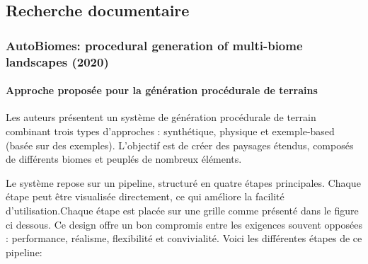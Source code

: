 
\subsection{Recherche documentaire}
\subsubsection{AutoBiomes: procedural generation of multi-biome landscapes (2020)}

    
    \paragraph{Approche proposée pour la génération procédurale de terrains}
    Les auteurs présentent un système de génération procédurale de terrain combinant trois types d’approches : synthétique, physique et exemple-based (basée sur des exemples). L’objectif est de créer des paysages étendus, composés de différents biomes et peuplés de nombreux éléments.
    
    Le système repose sur un pipeline, structuré en quatre étapes principales. Chaque étape peut être visualisée directement, ce qui améliore la facilité d’utilisation.Chaque étape est placée sur une grille comme présenté dans le figure ci dessous. Ce design offre un bon compromis entre les exigences souvent opposées : performance, réalisme, flexibilité et convivialité. Voici les différentes étapes de ce pipeline:

